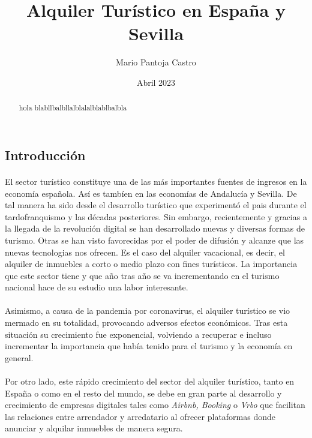 \documentclass[a4paper,10pt]{article}
\title{Alquiler Turístico en España y Sevilla}
\author{Mario Pantoja Castro}
\date{Abril 2023}
\begin{document}
    \maketitle

    \begin{abstract}
       hola blabllbalbllalblalalblablbalbla
    \end{abstract}

    \vspace{3mm}

    \begin{multicols}{2}
    
        \section{Introducción}

            \paragraph*{}
            El sector turístico constituye una de las más importantes fuentes de ingresos en la economía española. Así es tambíen en las economías de Andalucía y
            Sevilla. De tal manera ha sido desde el desarrollo turístico que experimentó el pais durante el tardofranquismo y las décadas posteriores. Sin embargo, 
            recientemente y gracias a la llegada de la revolución digital se han desarrollado nuevas y diversas formas de turismo. Otras se han visto favorecidas
            por el poder de difusión y alcanze que las nuevas tecnologias nos ofrecen. Es el caso del alquiler vacacional, es decir, el alquiler de inmuebles a
            corto o medio plazo con fines turísticos. La importancia que este sector tiene y que año tras año se va incrementando en el turismo nacional hace de 
            su estudio una labor interesante.
            
            \paragraph*{}
            Asimismo, a causa de la pandemia por coronavirus, el alquiler turístico se vio mermado en su totalidad, 
            provocando adversos efectos económicos. Tras esta situación su crecimiento fue exponencial, volviendo a recuperar e incluso incrementar la importancia
            que había tenido para el turismo y la economía en general.

            \paragraph*{}
            Por otro lado, este rápido crecimiento del sector del alquiler turístico, tanto en España o como en el resto del mundo, se debe en gran parte al 
            desarrollo y crecimiento de empresas digitales tales como \textit{Airbnb, Booking} o \textit{Vrbo} que facilitan las relaciones entre
            arrendador y arredatario al ofrecer plataformas donde anunciar y alquilar inmuebles de manera segura.


\end{multicols}
\end{document}
